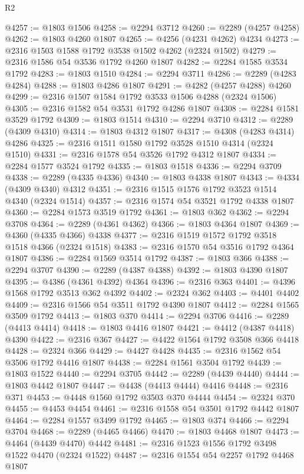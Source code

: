 \begin{lexlean}{R2}
\begin{coremodule}
@4257 := @1803 @1506
@4258 := @2294 @3712
@4260 := @2289 (@4257 @4258)
@4262 := @1803 @4260 @1807
@4265 := @4256 (@4231 @4262) @4234
@4273 := @2316 @1503 @1588 @1792 @3538 @1502 @4262 (@2324 @1502)
@4279 := @2316 @1586 @54 @3536 @1792 @4260 @1807
@4282 := @2284 @1585 @3534 @1792
@4283 := @1803 @1510
@4284 := @2294 @3711
@4286 := @2289 (@4283 @4284)
@4288 := @1803 @4286 @1807
@4291 := @4282 (@4257 @4288) @4260
@4299 := @2316 @1507 @1584 @1792 @3533 @1506 @4288 (@2324 @1506)
@4305 := @2316 @1582 @54 @3531 @1792 @4286 @1807
@4308 := @2284 @1581 @3529 @1792
@4309 := @1803 @1514
@4310 := @2294 @3710
@4312 := @2289 (@4309 @4310)
@4314 := @1803 @4312 @1807
@4317 := @4308 (@4283 @4314) @4286
@4325 := @2316 @1511 @1580 @1792 @3528 @1510 @4314 (@2324 @1510)
@4331 := @2316 @1578 @54 @3526 @1792 @4312 @1807
@4334 := @2284 @1577 @3524 @1792
@4335 := @1803 @1518
@4336 := @2294 @3709
@4338 := @2289 (@4335 @4336)
@4340 := @1803 @4338 @1807
@4343 := @4334 (@4309 @4340) @4312
@4351 := @2316 @1515 @1576 @1792 @3523 @1514 @4340 (@2324 @1514)
@4357 := @2316 @1574 @54 @3521 @1792 @4338 @1807
@4360 := @2284 @1573 @3519 @1792
@4361 := @1803 @362
@4362 := @2294 @3708
@4364 := @2289 (@4361 @4362)
@4366 := @1803 @4364 @1807
@4369 := @4360 (@4335 @4366) @4338
@4377 := @2316 @1519 @1572 @1792 @3518 @1518 @4366 (@2324 @1518)
@4383 := @2316 @1570 @54 @3516 @1792 @4364 @1807
@4386 := @2284 @1569 @3514 @1792
@4387 := @1803 @366
@4388 := @2294 @3707
@4390 := @2289 (@4387 @4388)
@4392 := @1803 @4390 @1807
@4395 := @4386 (@4361 @4392) @4364
@4396 := @2316 @363
@4401 := @4396 @1568 @1792 @3513 @362 @4392
@4402 := @2324 @362
@4403 := @4401 @4402
@4409 := @2316 @1566 @54 @3511 @1792 @4390 @1807
@4412 := @2284 @1565 @3509 @1792
@4413 := @1803 @370
@4414 := @2294 @3706
@4416 := @2289 (@4413 @4414)
@4418 := @1803 @4416 @1807
@4421 := @4412 (@4387 @4418) @4390
@4422 := @2316 @367
@4427 := @4422 @1564 @1792 @3508 @366 @4418
@4428 := @2324 @366
@4429 := @4427 @4428
@4435 := @2316 @1562 @54 @3506 @1792 @4416 @1807
@4438 := @2284 @1561 @3504 @1792
@4439 := @1803 @1522
@4440 := @2294 @3705
@4442 := @2289 (@4439 @4440)
@4444 := @1803 @4442 @1807
@4447 := @4438 (@4413 @4444) @4416
@4448 := @2316 @371
@4453 := @4448 @1560 @1792 @3503 @370 @4444
@4454 := @2324 @370
@4455 := @4453 @4454
@4461 := @2316 @1558 @54 @3501 @1792 @4442 @1807
@4464 := @2284 @1557 @3499 @1792
@4465 := @1803 @374
@4466 := @2294 @3704
@4468 := @2289 (@4465 @4466)
@4470 := @1803 @4468 @1807
@4473 := @4464 (@4439 @4470) @4442
@4481 := @2316 @1523 @1556 @1792 @3498 @1522 @4470 (@2324 @1522)
@4487 := @2316 @1554 @54 @2257 @1792 @4468 @1807

\end{coremodule}
\end{lexlean}
